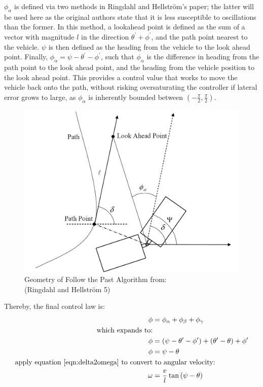 \documentclass[mla7]{mla}
\begin{document}
\begin{paper}
$\phi_\alpha$ is defined via two methods in Ringdahl and Hellström's paper; the latter will be used here as the original authors state that it is less susceptible to oscillations than the former. In this method, a lookahead point is defined as the sum of a vector with magnitude $l$ in the direction $\theta^\prime+\phi^\prime$, and the path point nearest to the vehicle. $\psi$ is then defined as the heading from the vehicle to the look ahead point. Finally, $\phi_\alpha=\psi-\theta^\prime-\phi^\prime$, such that $\phi_\alpha$ is the difference in heading from the path point to the look ahead point, and the heading from the vehicle position to the look ahead point. This provides a control value that works to move the vehicle back onto the path, without risking oversaturating the controller if lateral error grows to large, as $\phi_\alpha$ is inherently bounded between $(-\frac{\pi}{2},\frac{\pi}{2})$.

\begin{figure}[H]
\includegraphics[width=0.5\linewidth]{RingdahlFtPDiagram}
\captionsetup{justification=centering,margin=2cm}
\caption{Geometry of Follow the Past Algorithm from:\\(Ringdahl and Hellström 5)}
\label{img:ftp1}
\end{figure}

Thereby, the final control law is:
\begin{subequations}
\begin{align}
\phi &= \phi_\alpha+\phi_\beta+\phi_\gamma \\
\text{which expands to:}\nonumber \\
\phi &= (\psi-\theta^\prime-\phi^\prime) + (\theta^\prime-\theta) + \phi^\prime \\
\phi &= \psi-\theta \\
\text{apply equation \ref{eqn:delta2omega} to convert}&\text{ to angular velocity:}\nonumber \\
\omega &= \frac{v}{l}\tan{(\psi-\theta)}
\end{align}
\end{subequations}



\end{paper}
\end{document}

